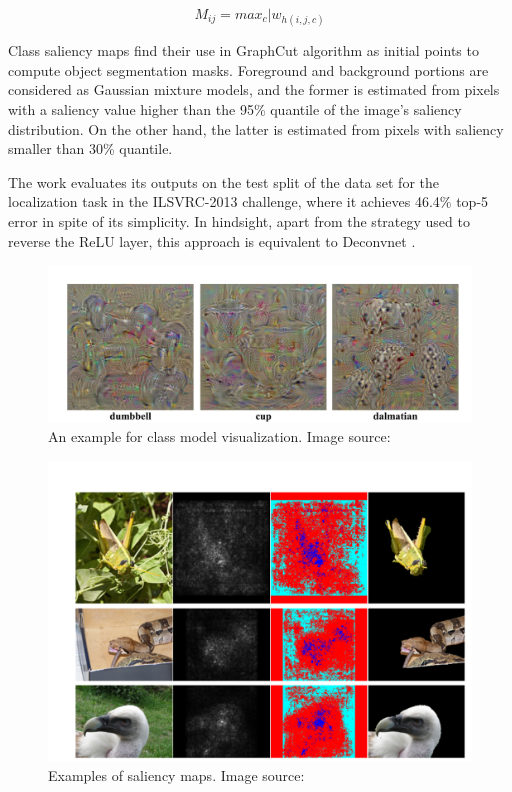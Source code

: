 \documentclass[../report.tex]{subfiles}
\begin{document}
 \begin{equation*}
 	M_{ij} = max_{c}|w_{h(i,j,c)}
 \end{equation*}
 
 Class saliency maps find their use in GraphCut algorithm \cite{boykov2006graph} as initial points to compute object segmentation masks. Foreground and background portions are considered as Gaussian mixture models, and the former is estimated from pixels with a saliency value higher than the 95\% quantile of the image’s saliency distribution. On the other hand, the latter is estimated from pixels with saliency smaller than 30\% quantile.
 
 The work evaluates its outputs on the test split of the data set for the localization task in the ILSVRC-2013 \cite{ILSVRC15} challenge, where it achieves 46.4\% top-5 error in spite of its simplicity.
 In hindsight, apart from the strategy used to reverse the ReLU layer, this approach is equivalent to Deconvnet \cite{matthew2014visualizing}.
 
 
 \begin{figure}[H]
 	\centering
 	\includegraphics[scale=0.25]{images/chapter3/saliency_1.png}
 	\caption[An example for class model visualization]{An example for class model visualization. Image source: \cite{simonyan2013deep}}
 	\label{fig_cmv}
 \end{figure}
 
  \begin{figure}[H]
  	\centering
 	\includegraphics[scale=0.2]{images/chapter3/saliency_2.png}
 	\caption[Examples of saliency maps]{Examples of saliency maps. Image source: \cite{simonyan2013deep}}
 	\label{fig_saliency_map}
 \end{figure}
  
\end{document}
